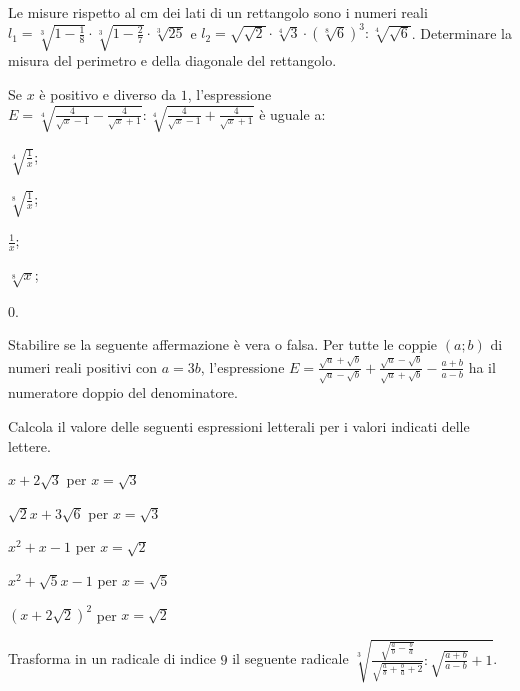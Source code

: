 \begin{esercizio}%
Le misure rispetto al cm dei lati di un rettangolo sono i numeri reali $l_1=\sqrt[3]{1-\frac 1 8}\cdot \sqrt[3]{1-\frac 2 7}\cdot \sqrt[3]{25}$ e $l_2=\sqrt{\sqrt 2}\cdot \sqrt[4]3\cdot (\sqrt[8]6)^3:\sqrt[4]{\sqrt 6}$. Determinare la misura del perimetro e della diagonale del rettangolo.
\end{esercizio}
\pagebreak
\begin{esercizio}%
Se $x$ è positivo e diverso da $1$, l'espressione $E=\sqrt[4]{\frac 4{\sqrt x-1}-\frac 4{\sqrt x+1}}:\sqrt[4]{\frac 4{\sqrt x-1}+\frac 4{\sqrt x+1}}$ è uguale a:
\begin{multicols}{5}
\begin{enumeratea}
 \item $\sqrt[4]{\frac 1 x}$;
 \item $\sqrt[8]{\frac 1 x}$;
 \item $\frac 1 x$;
 \item $\sqrt[8]x$;
 \item $0$.
\end{enumeratea}
\end{multicols}
\end{esercizio}

\begin{esercizio}%
Stabilire se la seguente affermazione è vera o falsa. Per tutte le coppie $(a;b)$ di numeri reali positivi con $a=3b$, l'espressione $E=\frac{\sqrt a+\sqrt b}{\sqrt a-\sqrt b}+\frac{\sqrt a-\sqrt b}{\sqrt a+\sqrt b}-\frac{a+b}{a-b}$ ha il numeratore doppio del denominatore.
\end{esercizio}

\begin{esercizio}%
Calcola il valore delle seguenti espressioni letterali per i valori indicati delle lettere.
\begin{multicols}{3}
\begin{enumeratea}
\item $x+2\sqrt 3$ per $x=\sqrt 3$
\item $\sqrt 2x+3\sqrt 6$ per $x=\sqrt{3}$
\item $x^2+x-1$ per $x=\sqrt 2$
\item $x^2+\sqrt 5x-1$ per $x=\sqrt 5$
\item $(x+2\sqrt 2)^2$ per $x=\sqrt 2$
\end{enumeratea}
\end{multicols}
\end{esercizio}

\begin{esercizio}%
Trasforma in un radicale di indice $9$ il seguente radicale $\sqrt[3]{\frac{\sqrt{\frac a b-\frac b a}}{\sqrt{\frac a b+\frac b a+2}}:\sqrt{\frac{a+b}{a-b}}+1}$.
\end{esercizio}

